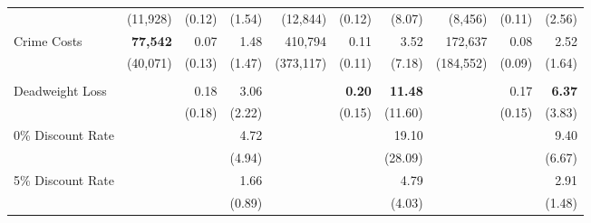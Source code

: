 \begin{tabular}{l r r r r r r r r r}
	&	(11,928)	&	(0.12)	&	(1.54)	&	(12,844)	&	(0.12)	&	(8.07)	&	(8,456)	&	(0.11)	&	(2.56)	\\
Crime Costs	&	\textbf{77,542}	&	0.07	&	1.48	&	410,794	&	0.11	&	3.52	&	172,637	&	0.08	&	2.52	\\
	&	(40,071)	&	(0.13)	&	(1.47)	&	(373,117)	&	(0.11)	&	(7.18)	&	(184,552)	&	(0.09)	&	(1.64)	\\ \\
Deadweight Loss	&		&	0.18	&	3.06	&		&	\textbf{0.20}	&	\textbf{11.48}	&		&	0.17	&	\textbf{6.37}	\\
	&		&	(0.18)	&	(2.22)	&		&	(0.15)	&	(11.60)	&		&	(0.15)	&	(3.83)	\\
0\% Discount Rate	&		&		&	4.72	&		&		&	19.10	&		&		&	9.40	\\
	&		&		&	(4.94)	&		&		&	(28.09)	&		&		&	(6.67)	\\
5\% Discount Rate	&		&		&	1.66	&		&		&	4.79	&		&		&	2.91	\\
	&		&		&	(0.89)	&		&		&	(4.03)	&		&		&	(1.48)	\\	

\bottomrule
\end{tabular}